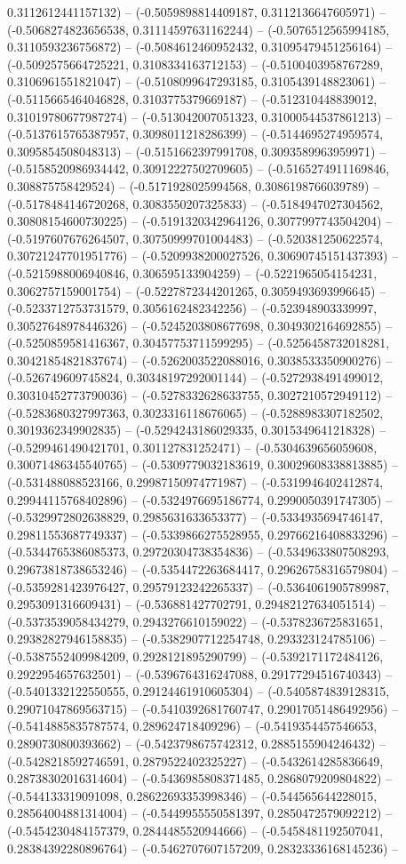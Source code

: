 0.3112612441157132) -- (-0.5059898814409187, 0.3112136647605971) -- (-0.5068274823656538, 0.31114597631162244) -- (-0.5076512565994185, 0.3110593236756872) -- (-0.5084612460952432, 0.31095479451256164) -- (-0.5092575664725221, 0.3108334163712153) -- (-0.5100403958767289, 0.3106961551821047) -- (-0.5108099647293185, 0.3105439148823061) -- (-0.5115665464046828, 0.3103775379669187) -- (-0.512310448839012, 0.31019780677987274) -- (-0.513042007051323, 0.31000544537861213) -- (-0.5137615765387957, 0.3098011218286399) -- (-0.5144695274959574, 0.3095854508048313) -- (-0.5151662397991708, 0.3093589963959971) -- (-0.5158520986934442, 0.30912227502709605) -- (-0.5165274911169846, 0.308875758429524) -- (-0.5171928025994568, 0.3086198766039789) -- (-0.5178484146720268, 0.3083550207325833) -- (-0.5184947027304562, 0.30808154600730225) -- (-0.5191320342964126, 0.3077997743504204) -- (-0.5197607676264507, 0.30750999701004483) -- (-0.520381250622574, 0.30721247701951776) -- (-0.5209938200027526, 0.30690745151437393) -- (-0.5215988006940846, 0.306595133904259) -- (-0.5221965054154231, 0.3062757159001754) -- (-0.5227872344201265, 0.3059493693996645) -- (-0.5233712753731579, 0.3056162482342256) -- (-0.523948903339997, 0.30527648978446326) -- (-0.5245203808677698, 0.3049302164692855) -- (-0.5250859581416367, 0.30457753711599295) -- (-0.5256458732018281, 0.30421854821837674) -- (-0.5262003522088016, 0.3038533350900276) -- (-0.526749609745824, 0.30348197292001144) -- (-0.5272938491499012, 0.30310452773790036) -- (-0.5278332628633755, 0.3027210572949112) -- (-0.5283680327997363, 0.3023316118676065) -- (-0.5288983307182502, 0.3019362349902835) -- (-0.5294243186029335, 0.3015349641218328) -- (-0.5299461490421701, 0.301127831252471) -- (-0.5304639656059608, 0.30071486345540765) -- (-0.5309779032183619, 0.30029608338813885) -- (-0.531488088523166, 0.29987150974771987) -- (-0.5319946402412874, 0.29944115768402896) -- (-0.5324976695186774, 0.2990050391747305) -- (-0.5329972802638829, 0.2985631633653377) -- (-0.5334935694746147, 0.29811553687749337) -- (-0.5339866275528955, 0.29766216408833296) -- (-0.5344765386085373, 0.29720304738354836) -- (-0.5349633807508293, 0.29673818738653246) -- (-0.5354472263684417, 0.29626758316579804) -- (-0.5359281423976427, 0.29579123242265337) -- (-0.5364061905789987, 0.2953091316609431) -- (-0.536881427702791, 0.29482127634051514) -- (-0.5373539058434279, 0.2943276610159022) -- (-0.5378236725831651, 0.29382827946158835) -- (-0.5382907712254748, 0.293323124785106) -- (-0.5387552409984209, 0.2928121895290799) -- (-0.5392171172484126, 0.2922954657632501) -- (-0.5396764316247088, 0.29177294516740343) -- (-0.5401332122550555, 0.29124461910605304) -- (-0.5405874839128315, 0.29071047869563715) -- (-0.5410392681760747, 0.29017051486492956) -- (-0.5414885835787574, 0.289624718409296) -- (-0.5419354457546653, 0.2890730800393662) -- (-0.5423798675742312, 0.2885155904246432) -- (-0.5428218592746591, 0.2879522402325227) -- (-0.5432614285836649, 0.28738302016314604) -- (-0.5436985808371485, 0.2868079209804822) -- (-0.544133319091098, 0.28622693353998346) -- (-0.544565644228015, 0.28564004881314004) -- (-0.5449955550581397, 0.2850472579092212) -- (-0.5454230484157379, 0.2844485520944666) -- (-0.5458481192507041, 0.28384392280896764) -- (-0.5462707607157209, 0.28323336168145236) -- 